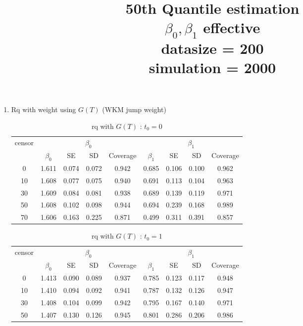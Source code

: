 \documentclass[12pt]{article}
\begin{document}
	\title{50th Quantile estimation\\
		$\beta_0, \beta_1$ effective\\
		datasize = 200\\
		simulation = 2000}
	\maketitle
	\newpage
	\begin{enumerate}
		\item Rq with weight using $G(T)$ (WKM jump weight)
		\begin{table}[hbt!]
			\caption{rq with $G(T)$ : $t_0=0$}
			\centering
			\begin{tabular}{|c|c|c|c|c|c|c|c|c|}
				\hline
				\multirow{2}{*}{censor} & \multicolumn{4}{c|}{$\beta_0$} & \multicolumn{4}{c|}{$\beta_1$}\\ \cline{2-9}
				 & $\beta_0$ & SE & SD  & Coverage  & $\beta_1$ & SE & SD & Coverage\\
				\hline\hline
				0 & 1.611 & 0.074 & 0.072 & 0.942 & 0.685 & 0.106 & 0.100 & 0.962 \\ 
  10 & 1.608 & 0.077 & 0.075 & 0.940 & 0.691 & 0.113 & 0.104 & 0.963 \\ 
  30 & 1.609 & 0.084 & 0.081 & 0.938 & 0.689 & 0.139 & 0.119 & 0.971 \\ 
  50 & 1.608 & 0.102 & 0.098 & 0.944 & 0.694 & 0.239 & 0.168 & 0.989 \\ 
  70 & 1.606 & 0.163 & 0.225 & 0.871 & 0.499 & 0.311 & 0.391 & 0.857 \\ 
				\hline
			\end{tabular}
		\end{table}
		\begin{table}[hbt!]
			\caption{rq with $G(T)$ : $t_0=1$}
			\centering
			\begin{tabular}{|c|c|c|c|c|c|c|c|c|}
				\hline
				\multirow{2}{*}{censor} & \multicolumn{4}{c|}{$\beta_0$} & \multicolumn{4}{c|}{$\beta_1$}\\ \cline{2-9}
				& $\beta_0$ & SE & SD  & Coverage  & $\beta_1$ & SE & SD & Coverage\\
				\hline\hline
				0 & 1.413 & 0.090 & 0.089 & 0.937 & 0.785 & 0.123 & 0.117 & 0.948 \\ 
  10 & 1.410 & 0.094 & 0.092 & 0.941 & 0.787 & 0.132 & 0.126 & 0.947 \\ 
  30 & 1.408 & 0.104 & 0.099 & 0.942 & 0.795 & 0.167 & 0.140 & 0.971 \\ 
  50 & 1.407 & 0.130 & 0.126 & 0.945 & 0.801 & 0.286 & 0.206 & 0.986 \\ 

\end{tabular}
\end{table}
\end{enumerate}
\end{document}
